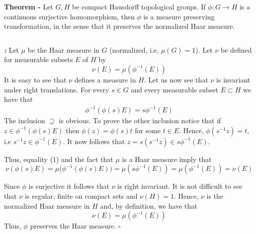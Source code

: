 \documentclass[12pt]{article}
\begin{document}

{\bf Theorem -} Let $G, H$ be compact Hausdorff topological groups. If $\phi:G \longrightarrow H$ is a continuous surjective homomorphism, then $\phi$ is a measure preserving transformation, in the sense that it preserves the normalized Haar measure.

$\,$

{\bf \emph{:}} Let $\mu$ be the Haar measure in $G$ (normalized, i.e. $\mu (G) = 1$). Let $\nu$ be defined for measurable subsets $E$ of $H$ by
\begin{displaymath}
\nu(E)=\mu(\phi^{-1}(E))
\end{displaymath}
It is easy to see that $\nu$ defines a measure in $H$. Let us now see that $\nu$ is invariant under right translations. For every $s \in G$ and every measurable subset $E \subset H$ we have that
\begin{align}
\phi^{-1}(\phi(s)E)=s\phi^{-1}(E)
\end{align}
The inclusion $\supseteq$ is obvious. To prove the other inclusion notice that if $z \in \phi^{-1}(\phi(s)E)$ then $\phi(z) = \phi(s)t$ for some $t \in E$. Hence, $\phi(s^{-1}z)=t$, i.e $s^{-1}z \in \phi^{-1}(E)$. It now follows that $z=s(s^{-1}z) \in s\phi^{-1}(E)$.

Thus, equality (1) and the fact that $\mu$ is a Haar measure imply that
\begin{displaymath}
\nu(\phi(s)E)= \mu \big(\phi^{-1}(\phi(s)E)\big)=\mu(s\phi^{-1}(E)) = \mu(\phi^{-1}(E)) = \nu(E)
\end{displaymath}

Since $\phi$ is surjective it follows that $\nu$ is right invariant. It is not difficult to see that $\nu$ is regular, finite on compact sets and $\nu(H) = 1$. Hence, $\nu$ is the normalized Haar measure in $H$ and, by definition, we have that
\begin{displaymath}
\nu(E)=\mu(\phi^{-1}(E))
\end{displaymath}
Thus, $\phi$ preserves the Haar measure. $\square$
\end{document}
